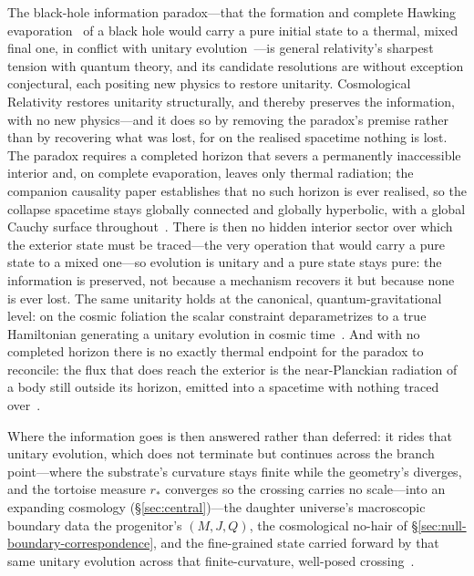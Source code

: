 \documentclass[11pt,a4paper]{article}
\theoremstyle{plain}
\theoremstyle{definition}
\theoremstyle{remark}
\begin{document}
The black-hole information paradox---that the formation and complete Hawking evaporation~\cite{Hawking1975} of a black hole would carry a pure initial state to a thermal, mixed final one, in conflict with unitary evolution~\cite{Hawking1976}---is general relativity's sharpest tension with quantum theory, and its candidate resolutions are without exception conjectural, each positing new physics to restore unitarity. Cosmological Relativity restores unitarity structurally, and thereby preserves the information, with no new physics---and it does so by removing the paradox's premise rather than by recovering what was lost, for on the realised spacetime nothing is lost. The paradox requires a completed horizon that severs a permanently inaccessible interior and, on complete evaporation, leaves only thermal radiation; the companion causality paper establishes that no such horizon is ever realised, so the collapse spacetime stays globally connected and globally hyperbolic, with a global Cauchy surface throughout~\cite{JanzenBHcausality}. There is then no hidden interior sector over which the exterior state must be traced---the very operation that would carry a pure state to a mixed one---so evolution is unitary and a pure state stays pure: the information is preserved, not because a mechanism recovers it but because none is ever lost. The same unitarity holds at the canonical, quantum-gravitational level: on the cosmic foliation the scalar constraint deparametrizes to a true Hamiltonian generating a unitary evolution in cosmic time~\cite{JanzenCanonicalTime}. And with no completed horizon there is no exactly thermal endpoint for the paradox to reconcile: the flux that does reach the exterior is the near-Planckian radiation of a body still outside its horizon, emitted into a spacetime with nothing traced over~\cite{JanzenBHcausality}.

Where the information goes is then answered rather than deferred: it rides that unitary evolution, which does not terminate but continues across the branch point---where the substrate's curvature stays finite while the geometry's diverges, and the tortoise measure $r_*$ converges so the crossing carries no scale---into an expanding cosmology (\S\ref{sec:central})---the daughter universe's macroscopic boundary data the progenitor's $(M,J,Q)$, the cosmological no-hair of \S\ref{sec:null-boundary-correspondence}, and the fine-grained state carried forward by that same unitary evolution across that finite-curvature, well-posed crossing~\cite{JanzenBHcausality}. 
\end{document}
